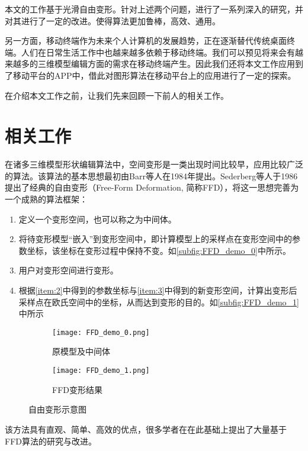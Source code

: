     本文的工作基于光滑自由变形\cite{Cui15}。针对上述两个问题，进行了一系列深入的研究，并对其进行了一定的改进。使得算法更加鲁棒，高效、通用。

    另一方面，移动终端作为未来个人计算机的发展趋势，正在逐渐替代传统桌面终端。人们在日常生活工作中也越来越多依赖于移动终端。我们可以预见将来会有越来越多的三维模型编辑方面的需求在移动终端产生。因此我们还将本文工作应用到了移动平台的APP中，借此对图形算法在移动平台上的应用进行了一定的探索。

    在介绍本文工作之前，让我们先来回顾一下前人的相关工作。


\section{相关工作}
    在诸多三维模型形状编辑算法中，空间变形是一类出现时间比较早，应用比较广泛的算法。该算法的基本思想最初由Barr等人\cite{Barr84}在1984年提出。Sederberg等人于1986提出了经典的自由变形（Free-Form Deformation, 简称FFD），将这一思想完善为一个成熟的算法框架\cite{Sederberg86}：
\begin{enumerate}
    \item 定义一个变形空间，也可以称之为中间体。
    \item 将待变形模型“嵌入”到变形空间中，即计算模型上的采样点在变形空间中的参数坐标，该坐标在变形过程中保持不变。如\autoref{subfig:FFD_demo_0}中所示。\label{item:2}
	\item 用户对变形空间进行变形。\label{item:3}
    \item 根据\ref{item:2}中得到的参数坐标与\ref{item:3}中得到的新变形空间，计算出变形后采样点在欧氏空间中的坐标，从而达到变形的目的。如\autoref{subfig:FFD_demo_1}中所示
\end{enumerate}


\begin{figure}[htbp]
	\centering
	\begin{subfigure}[b]{.4\textwidth}
		\centering
		\texttt{[image: FFD\_demo\_0.png]}
		\caption{原模型及中间体}\label{subfig:FFD_demo_0}
	\end{subfigure}
	\quad
	\begin{subfigure}[b]{.4\textwidth}
		\centering
		\texttt{[image: FFD\_demo\_1.png]}
		\caption{FFD变形结果}\label{subfig:FFD_demo_1}
	\end{subfigure}
    \caption{自由变形示意图\cite{Sederberg86}}\label{fig:FFD_demo}
\end{figure}

    该方法具有直观、简单、高效的优点，很多学者在在此基础上提出了大量基于FFD算法的研究与改进。

